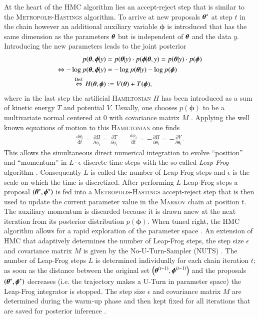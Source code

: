 At the heart of the HMC algorithm lies an accept-reject step that is similar to the \textsc{Metropolis-Hastings} algorithm. To arrive at new proposals $\boldsymbol{\theta}^*$ at step $t$ in the chain however an additional auxiliary variable $\boldsymbol{\phi}$ is introduced that has the same dimension as the parameters $\boldsymbol{\theta}$ but is independent of $\boldsymbol{\theta}$ and the data $y$. Introducing the new parameters leads to the joint posterior \cite{stan} 
\begin{equation}
	\begin{aligned}
		p(\boldsymbol{\theta},\boldsymbol{\phi}|y)&=p(\boldsymbol{\theta}|y)\cdot p(\boldsymbol{\phi}|\boldsymbol{\theta},y)=p(\boldsymbol{\theta}|y)\cdot p(\boldsymbol{\phi})\\
		\Leftrightarrow-\log p(\boldsymbol{\theta},\boldsymbol{\phi}|y)&=-\log p(\boldsymbol{\theta}|y)-\log p(\boldsymbol{\phi})\\
		\overset{\text{Def.}}{\Leftrightarrow} H(\boldsymbol{\theta},\boldsymbol{\phi}) &:=V(\boldsymbol{\theta})+T(\boldsymbol{\phi}), 	
	\end{aligned}
\end{equation} 
where in the last step the artificial \textsc{Hamiltonian} $H$ has been introduced as a sum of kinetic energy $T$ and potential $V$. Usually, one chooses $p(\boldsymbol{\phi})$ to be a multivariate normal centered at $0$ with covariance matrix $M$ \cite{bayes}. Applying the well known equations of motion to this \textsc{Hamiltonian} one finds 
\begin{align}
	\frac{\text{d}\theta_i}{\text{d}t}=\frac{\partial H}{\partial \phi_i}=\frac{\partial T}{\partial \phi_i} && \frac{\text{d}\phi_i}{\text{d}t}=-\frac{\partial H}{\partial \theta_i}=-\frac{\partial V}{\partial \theta_i}.
\end{align}
This allows the simultaneous direct numerical integration to evolve \enquote{position} and \enquote{momentum} in $L\cdot\epsilon$ discrete time steps with the so-called \emph{Leap-Frog} algorithm \cite{leapfrog}. Consequently $L$ is called the number of Leap-Frog steps and $\epsilon$ is the scale on which the time is discretized. After performing $L$ Leap-Frog steps a proposal $\left(\boldsymbol{\theta}^*,\boldsymbol{\phi}^*\right)$ is fed into a \textsc{Metropolis-Hastings} accept-reject step that is then used to update the current parameter value in the \textsc{Markov} chain at position $t$. The auxiliary momentum is discarded because it is drawn anew at the next iteration from its posterior distribution $p(\boldsymbol{\phi})$. When tuned right, the HMC algorithm allows for a rapid exploration of the parameter space \cite{bayes}. An extension of HMC that adaptively determines the number of Leap-Frog steps, the step size $\epsilon$ and covariance matrix $M$ is given by the No-U-Turn-Sampler (NUTS) \cite{nuts}. The number of Leap-Frog steps $L$ is determined individually for each chain iteration $t$; as soon as the distance between the original set $\left(\boldsymbol{\theta}^{(t-1)},\boldsymbol{\phi}^{(t-1)}\right)$ and the proposals $\left(\boldsymbol{\theta}^*,\boldsymbol{\phi}^*\right)$ decreases (i.e. the trajectory makes a U-Turn in parameter space) the Leap-Frog integrator is stopped. The step size $\epsilon$ and covariance matrix $M$ are determined during the warm-up phase and then kept fixed for all iterations that are saved for posterior inference \cite{bayes}.
